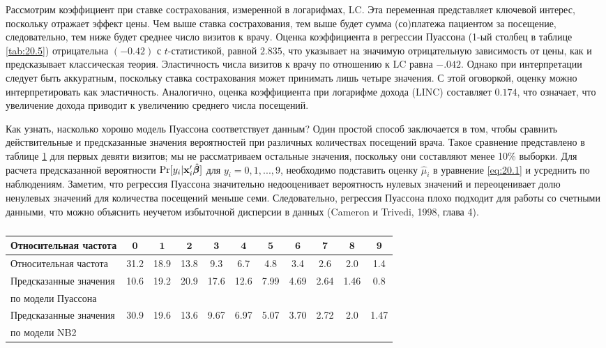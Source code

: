 Рассмотрим коэффициент при ставке сострахования, измеренной в логарифмах, LC. Эта переменная представляет ключевой интерес, поскольку отражает эффект цены. %
Чем выше ставка сострахования, тем выше будет сумма (со)платежа пациентом за посещение, следовательно, тем ниже будет среднее число визитов к врачу. Оценка коэффициента в регрессии Пуассона (1-ый столбец в таблице \ref{tab:20.5}) отрицательна $(-0.42)$ с $t$-статистикой, равной $2.835$, что указывает на значимую отрицательную зависимость от цены, как и предсказывает классическая теория. Эластичность числа визитов к врачу по отношению к LC равна $-.042$. Однако при интерпретации следует быть аккуратным, поскольку ставка сострахования может принимать лишь четыре значения. С этой оговоркой, оценку можно интерпретировать как эластичность. Аналогично, оценка коэффициента при логарифме дохода (LINC) составляет $0.174$, что означает, что увеличение дохода приводит к увеличению среднего числа посещений.

Как узнать, насколько хорошо модель Пуассона соответствует данным? Один простой способ заключается в том, чтобы сравнить действительные и предсказанные значения вероятностей при различных количествах посещений врача. Такое сравнение представлено в таблице \ref{tab:20.6} для первых девяти визитов; мы не рассматриваем остальные значения, поскольку они составляют менее 10\% выборки. Для расчета предсказанной вероятности $\mathrm{Pr}[y_i|\mathbf{x}'_i\hat{\bm{\beta}}]$ для $y_i = 0, 1, ..., 9$, необходимо подставить оценку $\hat{\mu}_i$ в уравнение \ref{eq:20.1} и усреднить по наблюдениям. Заметим, что регрессия Пуассона значительно недооценивает вероятность нулевых значений и переоценивает долю ненулевых значений для количества посещений меньше семи. Следовательно, регрессия Пуассона плохо подходит для работы со счетными данными, что можно объяснить неучетом избыточной дисперсии в данных (Cameron и Trivedi, 1998, глава 4).

    \begin{table}[!htbp]\caption{\textit{}}\label{tab:20.6}
    \begin{center}
\begin{tabular}{lcccccccccc}
\hline \hline
\textbf{Относительная частота} &$\mathbf{0}$&$\mathbf{1}$&$\mathbf{2}$&$\mathbf{3}$&$\mathbf{4}$&$\mathbf{5}$&$\mathbf{6}$&$\mathbf{7}$&$\mathbf{8}$&$\mathbf{9}$\\
\hline
Относительная частота           &31.2&18.9&13.8&9.3&6.7&4.8&3.4&2.6&2.0&1.4\\
Предсказанные значения          &10.6&19.2&20.9&17.6&12.6&7.99&4.69&2.64&1.46&0.8\\
по модели Пуассона              &&&&&&&&&&\\
Предсказанные значения          &30.9&19.6&13.6&9.67&6.97&5.07&3.70&2.72&2.0&1.47\\
по модели NB2                   &&&&&&&&&&\\
\hline \hline
\end{tabular}
    \end{center}
    \end{table}


